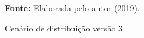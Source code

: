 \begin{figure}[ht!]
\centering

\caption{\textmd{Cenário de distribuição versão 3}}
\label{fig:cenario3}

\par\medskip\textbf{Fonte:} Elaborada pelo autor (2019). \par\medskip
\end{figure}

